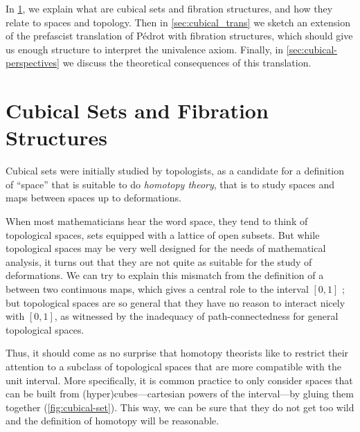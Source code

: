 % 
In \cref{sec:cubical_sets}, we explain what are cubical sets and fibration 
structures, and how they relate to spaces and topology. 
% 
Then in \cref{sec:cubical_trans} we sketch an extension of the prefascist 
translation of Pédrot with fibration structures, which should give us enough 
structure to interpret the univalence axiom.
% 
Finally, in \cref{sec:cubical-perspectives} we discuss the theoretical 
consequences of this translation.

\section{Cubical Sets and Fibration Structures}
\label{sec:cubical_sets}

Cubical sets were initially studied by topologists, as a candidate for a 
definition of ``space'' that is suitable to do \emph{homotopy theory}, that is 
to study spaces and maps between spaces up to deformations.

When most mathematicians hear the word space, they tend to think of topological
spaces, \ie sets equipped with a lattice of open subsets. 
% 
But while topological spaces may be very well designed for the needs of 
mathematical analysis, it turns out that they are not quite as suitable for 
the study of deformations. 
% 
We can try to explain this mismatch from the definition of a 
 between two continuous maps, 
which gives a central role to the interval \( [0, 1] \) ; but topological 
spaces are so general that they have no reason to interact nicely with \( [0, 1] \),
as witnessed by the inadequacy of path-connectedness for general topological 
spaces.

Thus, it should come as no surprise that homotopy theorists like to restrict their 
attention to a subclass of topological spaces that are more compatible with
the unit interval. 
More specifically, it is common practice to only consider spaces that can be 
built from (hyper)cubes---cartesian powers of the interval---by gluing them together 
(\cref{fig:cubical-set}). This way, we can be sure that they do not 
get too wild and the definition of homotopy will be reasonable.

